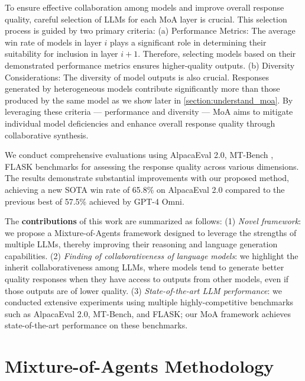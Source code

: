 \documentclass{article}
\begin{document}
To ensure effective collaboration among models and improve overall response quality, 
careful selection of LLMs for each MoA layer is crucial. 
This selection process is guided by two primary criteria:
(a) Performance Metrics: The average win rate of models in layer \(i\) plays a significant role in determining their suitability for inclusion in layer \(i+1\). Therefore, selecting models based on their demonstrated performance metrics ensures higher-quality outputs.
(b) Diversity Considerations: The diversity of model outputs is also crucial. 
Responses generated by heterogeneous models contribute significantly more than those produced by the same model as we show later in \cref{section:understand_moa}.
By leveraging these criteria — performance and diversity 
— MoA aims to mitigate individual model deficiencies and enhance overall response quality through collaborative synthesis.

We conduct comprehensive evaluations using AlpacaEval 2.0, MT-Bench \citep{mt-bench}, FLASK \citep{flask} benchmarks for assessing the response quality across various dimensions. The results demonstrate substantial improvements with our proposed method, achieving a new SOTA win rate of 65.8\% on AlpacaEval 2.0 compared to the previous best of 57.5\% achieved by GPT-4 Omni.

The \textbf{contributions} of this work are summarized as follows:
(1) \textit{Novel framework}: we propose a Mixture-of-Agents framework designed to leverage the strengths of multiple LLMs, thereby improving their reasoning and language generation capabilities.
(2) \textit{Finding of collaborativeness of language models}: we highlight the inherit collaborativeness among LLMs, where models tend to generate better quality responses when they have access to outputs from other models, even if those outputs are of lower quality.
(3) \textit{State-of-the-art LLM performance}: we conducted extensive experiments using multiple highly-competitive benchmarks such as AlpacaEval 2.0, MT-Bench, and FLASK; our MoA framework achieves state-of-the-art performance on these benchmarks.



\section{Mixture-of-Agents Methodology}
\label{section:method}
\end{document}
